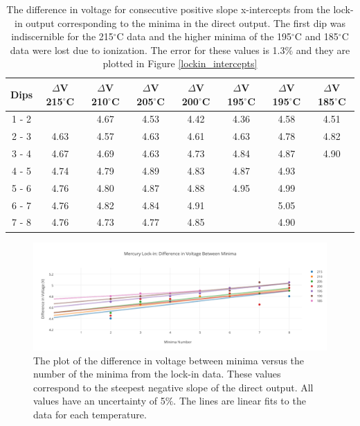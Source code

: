 \documentclass[prb,preprint]{revtex4-1}
\begin{document}
\begin{table}[h!]
\centering

\caption{The difference in voltage for consecutive positive slope x-intercepts from the lock-in output corresponding to the minima in the direct output. The first dip was indiscernible for the 215$^{\circ}$C data and the higher minima of the 195$^{\circ}$C and 185$^{\circ}$C data were lost due to ionization. The error for these values is 1.3$\%$ and they are plotted in Figure \ref{lockin_intercepts}}

\begin{ruledtabular}
\begin{tabular}{c c c c c c c c}
Dips & $\Delta$V 215$^{\circ}$C & $\Delta$V 210$^{\circ}$C  & $\Delta$V 205$^{\circ}$C &$\Delta$V 200$^{\circ}$C  & $\Delta$V 195$^{\circ}$C  & $\Delta$V 195$^{\circ}$C &$\Delta$V 185$^{\circ}$C  \\
\hline	%
1 - 2 &         & 4.67 & 4.53 & 4.42 & 4.36 & 4.58 & 4.51 \\
2 - 3 & 4.63 & 4.57 & 4.63 & 4.61 & 4.63 & 4.78 & 4.82 \\
3 - 4 & 4.67 & 4.69 & 4.63 & 4.73 & 4.84 & 4.87 & 4.90 \\
4 - 5 & 4.74 & 4.79 & 4.89 & 4.83 & 4.87 & 4.93 &         \\
5 - 6 & 4.76 & 4.80 & 4.87 & 4.88 & 4.95 & 4.99 &         \\
6 - 7 & 4.76 & 4.82 & 4.84 & 4.91 &         & 5.05 &         \\
7 - 8 & 4.76 & 4.73 & 4.77 & 4.85 &         & 4.90 &         \\

\end{tabular}
\end{ruledtabular}
\label{hg_lockin_table}
\end{table}


\begin{figure}[h!]
\centering

\includegraphics[width=6in]{lockin_minima.pdf}
\caption{The plot of the difference in voltage between minima versus the number of the minima from the lock-in data. These values correspond to the steepest negative slope of the direct output. All values have an uncertainty of 5$\%$. The lines are linear fits to the data for each temperature.}

\label{lockin_minima}
\end{figure}
\end{document}
